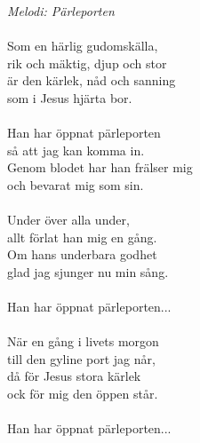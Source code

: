 {\footnotesize\textit{Melodi: Pärleporten}}\\
\\
Som en härlig gudomskälla,\\
rik och mäktig, djup och stor\\
är den kärlek, nåd och sanning\\
som i Jesus hjärta bor.\\
\\
Han har öppnat pärleporten\\
så att jag kan komma in.\\
Genom blodet har han frälser mig\\
och bevarat mig som sin.\\
\\
Under över alla under,\\
allt förlat han mig en gång.\\
Om hans underbara godhet\\
glad jag sjunger nu min sång.\\
\\
Han har öppnat pärleporten...\\
\\
När en gång i livets morgon\\
till den gyline port jag når,\\
då för Jesus stora kärlek\\
ock för mig den öppen står.\\
\\
Han har öppnat pärleporten...

